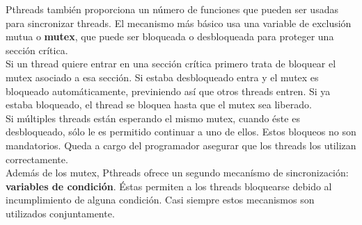 Pthreads también proporciona un número de funciones que pueden ser usadas para sincronizar threads. El mecanismo más básico usa una variable
de exclusión mutua o \textbf{mutex}, que puede ser bloqueada o desbloqueada para proteger una sección crítica.\\
Si un thread quiere entrar en una sección crítica primero trata de bloquear el mutex asociado a esa sección. Si estaba desbloqueado entra y 
el mutex es bloqueado automáticamente, previniendo así que otros threads entren. Si ya estaba bloqueado, el thread se bloquea hasta que el
mutex sea liberado.\\ 
Si múltiples threads están esperando el mismo mutex, cuando éste es desbloqueado, sólo le es permitido continuar a uno de ellos.
Estos bloqueos no son mandatorios. Queda a cargo del programador asegurar que los threads los utilizan correctamente.\\

Además de los mutex, Pthreads ofrece un segundo mecanísmo de sincronización: \textbf{variables de condición}. Éstas permiten a los threads 
bloquearse debido al incumplimiento de alguna condición. Casi siempre estos mecanismos son utilizados conjuntamente.

